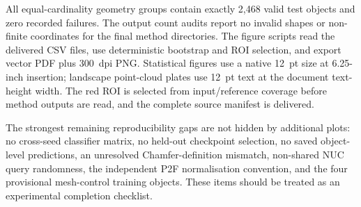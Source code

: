 All equal-cardinality geometry groups contain exactly 2,468 valid test objects and zero recorded failures. The output count audits report no invalid shapes or non-finite coordinates for the final method directories. The figure scripts read the delivered CSV files, use deterministic bootstrap and ROI selection, and export vector PDF plus 300~dpi PNG. Statistical figures use a native 12~pt size at 6.25-inch insertion; landscape point-cloud plates use 12~pt text at the document text-height width. The red ROI is selected from input/reference coverage before method outputs are read, and the complete source manifest is delivered.

The strongest remaining reproducibility gaps are not hidden by additional plots: no cross-seed classifier matrix, no held-out checkpoint selection, no saved object-level predictions, an unresolved Chamfer-definition mismatch, non-shared NUC query randomness, the independent P2F normalisation convention, and the four provisional mesh-control training objects. These items should be treated as an experimental completion checklist.

